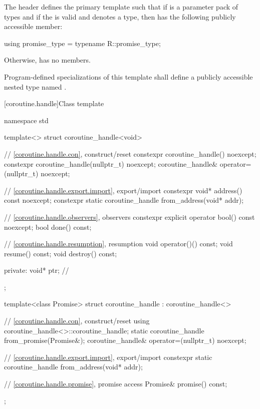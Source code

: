 \pnum
The header  defines the primary template
 such that
if  is a parameter pack of types and
if the   is valid and
denotes a type,
then  has the following publicly
accessible member:

\begin{codeblock}
  using promise_type = typename R::promise_type;
\end{codeblock}

Otherwise,  has no members.

\pnum
Program-defined specializations of this template shall define a publicly
accessible nested type named .

[coroutine.handle]{Class template }

%
\begin{codeblock}
namespace std {
  template<>
  struct coroutine_handle<void>
  {
    // \ref{coroutine.handle.con}, construct/reset
    constexpr coroutine_handle() noexcept;
    constexpr coroutine_handle(nullptr_t) noexcept;
    coroutine_handle& operator=(nullptr_t) noexcept;

    // \ref{coroutine.handle.export.import}, export/import
    constexpr void* address() const noexcept;
    constexpr static coroutine_handle from_address(void* addr);

    // \ref{coroutine.handle.observers}, observers
    constexpr explicit operator bool() const noexcept;
    bool done() const;

    // \ref{coroutine.handle.resumption}, resumption
    void operator()() const;
    void resume() const;
    void destroy() const;

  private:
    void* ptr;  // \expos
  };

  template<class Promise>
  struct coroutine_handle : coroutine_handle<>
  {
    // \ref{coroutine.handle.con}, construct/reset
    using coroutine_handle<>::coroutine_handle;
    static coroutine_handle from_promise(Promise&);
    coroutine_handle& operator=(nullptr_t) noexcept;

    // \ref{coroutine.handle.export.import}, export/import
    constexpr static coroutine_handle from_address(void* addr);

    // \ref{coroutine.handle.promise}, promise access
    Promise& promise() const;
  };
}
\end{codeblock}


